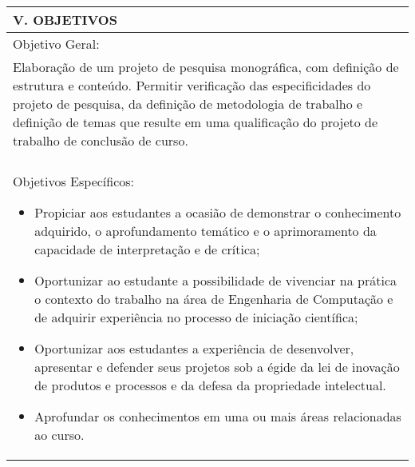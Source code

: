 \documentclass[12pt]{article}
\begin{document}
\begin{longtable}{|L{1.025\textwidth}|} \hline
%
{\bf V. OBJETIVOS } \\ \hline
Objetivo Geral:\\

Elaboração de um projeto de pesquisa monográfica, com definição de estrutura e conteúdo. Permitir verificação das especificidades do projeto de pesquisa, da definição de metodologia de trabalho e definição de temas que resulte em uma qualificação do projeto de trabalho de conclusão de curso.\\
\\
Objetivos Específicos:
\begin{itemize}
\item Propiciar aos estudantes a ocasião de demonstrar o conhecimento adquirido, o aprofundamento temático e o aprimoramento da capacidade de interpretação e de crítica; 
\item Oportunizar ao estudante a possibilidade de vivenciar na prática o contexto do trabalho na área de Engenharia de Computação e de adquirir experiência no processo de iniciação científica; 
\item Oportunizar aos estudantes a experiência de desenvolver, apresentar e defender seus projetos sob a égide da lei de inovação de produtos e processos e da defesa da propriedade intelectual. 
\item Aprofundar os conhecimentos em uma ou mais áreas relacionadas ao curso.
\end{itemize}
\\ \hline
\end{longtable}
\end{document}
